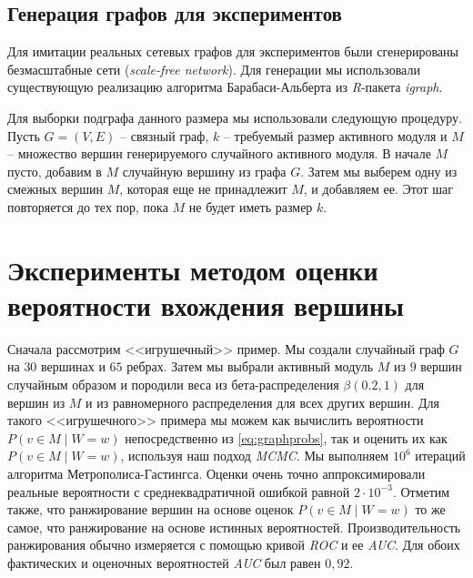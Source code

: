 \subsection{Генерация графов для экспериментов}
\label{sec_details}

Для имитации реальных сетевых графов для экспериментов были сгенерированы
безмасштабные сети (\emph{scale-free network}).  Для генерации мы использовали
существующую реализацию алгоритма Барабаси-Альберта из \emph{R}-пакета
\emph{igraph}.

Для выборки подграфа данного размера мы использовали следующую процедуру.
Пусть $G = (V, E)$ -- связный граф, $k$ -- требуемый размер активного модуля
и $M$ -- множество вершин генерируемого случайного активного модуля. В начале
$M$ пусто, добавим в $M$ случайную вершину из графа $G$.  Затем мы выберем
одну из смежных вершин $M$, которая еще не принадлежит $M$, и добавляем ее.
Этот шаг повторяется до тех пор, пока $M$ не будет иметь размер $k$.





\section{Эксперименты методом оценки вероятности вхождения вершины}

Сначала рассмотрим <<игрушечный>> пример. Мы создали случайный граф $G$ на $30$
вершинах и $65$ ребрах.  Затем мы выбрали активный модуль $M$ из $9$ вершин
случайным образом и породили веса из бета-распределения $\beta(0.2, 1)$ для
вершин из $M$ и из равномерного распределения для всех других вершин.  Для
такого <<игрушечного>> примера мы можем как вычислить вероятности $P(v \in
M \mid W=w)$ непосредственно из \eqref{eq:graphprobs}, так и оценить их как
$P(v \in M \mid W=w)$, используя наш подход \emph{MCMC}.  Мы выполняем $10^6$
итераций алгоритма Метрополиса-Гастингса.  Оценки очень точно аппроксимировали
реальные вероятности с среднеквадратичной ошибкой равной $2 \cdot 10^{-3}$.
Отметим также, что ранжирование вершин на основе оценок $P(v \in M \mid W=w)$
то же самое, что ранжирование на основе истинных вероятностей.
Производительность ранжирования обычно измеряется с помощью кривой \emph{ROC}
и ее \emph{AUC}. Для обоих фактических и оценочных вероятностей \emph{AUC} был равен
$0,92$.

